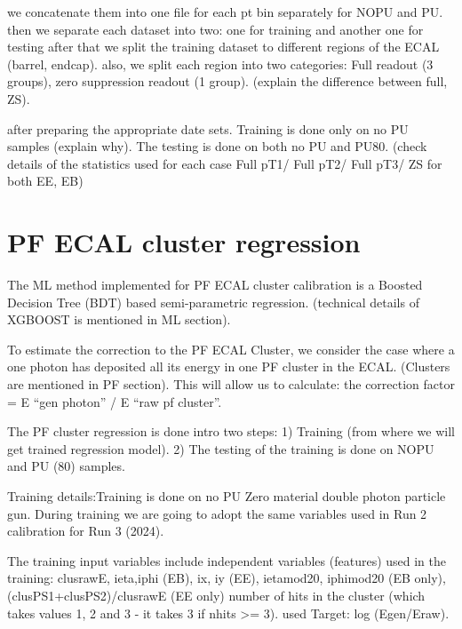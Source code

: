 we concatenate them into one file for each pt bin separately for NOPU and PU.  
then we separate each dataset into two: one for training and another one for testing  
after that we split the training dataset to different regions of the ECAL (barrel, endcap).  
also, we split each region into two categories: Full readout (3 groups), zero suppression readout (1 group). (explain the difference between full, ZS).

after preparing the appropriate date sets. Training is done only on no PU samples (explain why). The testing is done on both no PU and PU80. (check details of the statistics used for each case Full pT1/ Full pT2/ Full pT3/ ZS for both EE, EB) 

\section{PF ECAL cluster regression}

The ML method implemented for PF ECAL cluster calibration is a Boosted Decision Tree (BDT) based semi-parametric regression. (technical details of XGBOOST is mentioned in ML section).

To estimate the correction to the PF ECAL Cluster, we consider the case where a one photon has deposited all its energy in one PF cluster in the ECAL. (Clusters are mentioned in PF section). This will allow us to calculate: the correction factor = E “gen photon” / E “raw pf cluster”.

The PF cluster regression is done intro two steps:  
1) Training (from where we will get trained regression model). %
2) The testing of the training is done on NOPU and PU (80) samples. %

Training details:Training is done on no PU Zero material double photon particle gun. During training we are going to adopt the same variables used in Run 2 calibration for Run 3 (2024). 

The training input variables include independent variables (features) used in the training:  clusrawE, ieta,iphi (EB), ix, iy (EE), ietamod20, iphimod20 (EB only), (clusPS1+clusPS2)/clusrawE (EE only) number of hits in the cluster (which takes values 1, 2 and 3 - it takes 3 if nhits >= 3).
used Target: log (Egen/Eraw). %

